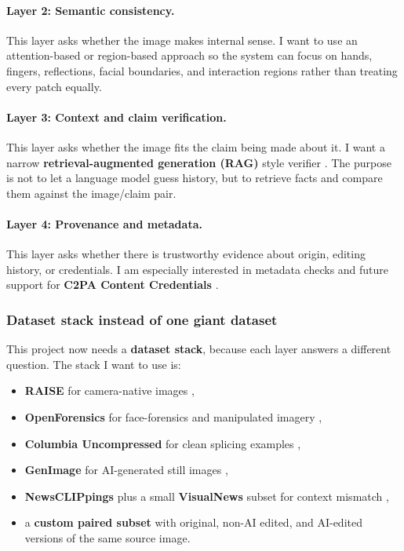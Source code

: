\documentclass[11pt]{article}
\begin{document}
\paragraph{Layer 2: Semantic consistency.}
This layer asks whether the image makes internal sense. I want to use an attention-based or region-based approach \cite{vaswani2017attention} so the system can focus on hands, fingers, reflections, facial boundaries, and interaction regions rather than treating every patch equally.

\paragraph{Layer 3: Context and claim verification.}
This layer asks whether the image fits the claim being made about it. I want a narrow \textbf{retrieval-augmented generation (RAG)} style verifier \cite{lewis2020rag}. The purpose is not to let a language model guess history, but to retrieve facts and compare them against the image/claim pair.

\paragraph{Layer 4: Provenance and metadata.}
This layer asks whether there is trustworthy evidence about origin, editing history, or credentials. I am especially interested in metadata checks and future support for \textbf{C2PA Content Credentials} \cite{c2pa}.

\subsubsection{Dataset stack instead of one giant dataset}
This project now needs a \textbf{dataset stack}, because each layer answers a different question. The stack I want to use is:
\begin{itemize}[leftmargin=1.5em]
    \item \textbf{RAISE} for camera-native images \cite{raise},
    \item \textbf{OpenForensics} for face-forensics and manipulated imagery \cite{le2021openforensics},
    \item \textbf{Columbia Uncompressed} for clean splicing examples \cite{columbia},
    \item \textbf{GenImage} for AI-generated still images \cite{genimage},
    \item \textbf{NewsCLIPpings} plus a small \textbf{VisualNews} subset for context mismatch \cite{newsclippings,visualnews},
    \item a \textbf{custom paired subset} with original, non-AI edited, and AI-edited versions of the same source image.
\end{itemize}
\end{document}
